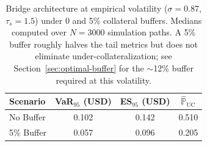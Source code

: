 \begin{table}[t]
\centering
\footnotesize
\caption{Bridge architecture at empirical volatility ($\sigma{=}0.87$, $\tau_s{=}1.5$) under 0 and 5\% collateral buffers. Medians computed over $N{=}3000$ simulation paths. A 5\% buffer roughly halves the tail metrics but does not eliminate under-collateralization; see Section~\ref{sec:optimal-buffer} for the $\sim$12\% buffer required at this volatility.}
\label{tab:bridge_baselines}
\begin{tabular}{l c c c}
\hline
Scenario & VaR$_{95}$ (USD) & ES$_{95}$ (USD) & $\widehat{\mathbb{P}}_{\mathrm{UC}}$ \\
\hline
No Buffer & 0.102 & 0.142 & 0.510 \\
5\% Buffer & 0.057 & 0.096 & 0.205 \\
\hline
\end{tabular}
\end{table}
